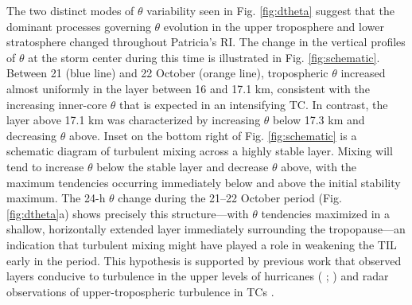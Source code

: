 The two distinct modes of $\theta$ variability seen in Fig. \ref{fig:dtheta} suggest that the dominant processes governing $\theta$ evolution in the upper troposphere and lower stratosphere changed throughout Patricia’s RI.
The change in the vertical profiles of $\theta$ at the storm center during this time is illustrated in Fig. \ref{fig:schematic}.
Between 21 (blue line) and 22 October (orange line), tropospheric $\theta$ increased almost uniformly in the layer between 16 and 17.1 km, consistent with the increasing inner-core $\theta$ that is expected in an intensifying TC.
In contrast, the layer above 17.1 km was characterized by increasing $\theta$ below 17.3 km and decreasing $\theta$ above.
Inset on the bottom right of Fig. \ref{fig:schematic} is a schematic diagram of turbulent mixing across a highly stable layer.
Mixing will tend to increase $\theta$ below the stable layer and decrease $\theta$ above, with the maximum tendencies occurring immediately below and above the initial stability maximum.
The 24-h $\theta$ change during the 21--22 October period (Fig. \ref{fig:dtheta}a) shows precisely this structure---with $\theta$ tendencies maximized in a shallow, horizontally extended layer immediately surrounding the tropopause---an indication that turbulent mixing might have played a role in weakening the TIL early in the period.
This hypothesis is supported by previous work that observed layers conducive to turbulence in the upper levels of hurricanes (\citeauthor{Molinarietal2014} \citeyear{Molinarietal2014}; \citeauthor{DuranMolinari2016} \citeyear{DuranMolinari2016}) and radar observations of upper-tropospheric turbulence in TCs \citep{Dasetal2008}.

